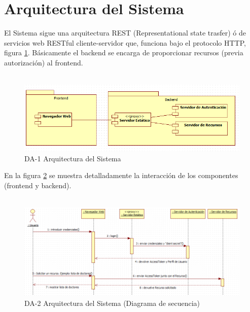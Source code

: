 \section{Arquitectura del Sistema}

	El Sistema sigue una arquitectura REST (Representational state trasfer) ó
	de servicios web RESTful cliente-servidor que, funciona bajo el protocolo
	HTTP, figura \ref{figure:arq1}. Básicamente el backend se encarga 
	de proporcionar recursos (previa autorización) al frontend.
	\\\
	
	\begin{figure}[ht!]
	    \centering
		\includegraphics[width=18cm]{../imgs/disenio/arq1.png}
		\caption{DA-1 Arquitectura del Sistema}
		\label{figure:arq1}
	\end{figure}
	
	
	En la figura \ref{figure:arq2} se muestra detalladamente la interacción de los
	componentes (frontend y backend).
	\\\
	
	\begin{figure}[ht!]
	    \centering
		\includegraphics[width=18cm]{../imgs/disenio/arq2.png}
		\caption{DA-2 Arquitectura del Sistema (Diagrama de secuencia)}
		\label{figure:arq2}
	\end{figure}